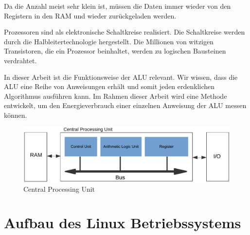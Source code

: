 Da die Anzahl meist sehr klein ist, müssen die Daten immer wieder von den Registern in den RAM und wieder zurückgeladen werden.
\par
Prozessoren sind als elektronische Schaltkreise realisiert. Die Schaltkreise werden durch die Halbleitertechnologie hergestellt. Die Millionen von witzigen Transistoren, die ein Prozessor beinhaltet, werden zu logischen Bausteinen verdrahtet.
\par
In dieser Arbeit ist die Funktionsweise der ALU relevant. Wir wissen, dass die ALU eine Reihe von Anweisungen erhält und somit jeden erdenklichen Algorithmus ausführen kann. Im Rahmen dieser Arbeit wird eine Methode entwickelt, um den Energieverbrauch einer einzelnen Anweisung der ALU messen können.



\begin{figure}[t]
\centering
\includegraphics[width=1.0\textwidth]{images/cpu.pdf}
\caption{Central Processing Unit}
\label{fig:CPU}
\end{figure}

\section{Aufbau des Linux Betriebssystems}

